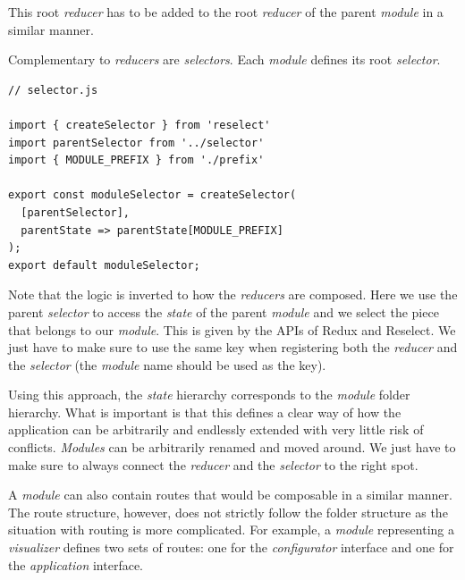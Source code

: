 This root \emph{reducer} has to be added to the root \emph{reducer} of the parent \emph{module} in a similar manner. 

Complementary to \emph{reducers} are \emph{selectors}. Each \emph{module} defines its root \emph{selector}.

\begin{verbatim}
// selector.js

import { createSelector } from 'reselect'
import parentSelector from '../selector'
import { MODULE_PREFIX } from './prefix'

export const moduleSelector = createSelector(
  [parentSelector],
  parentState => parentState[MODULE_PREFIX]
);
export default moduleSelector;
\end{verbatim}

Note that the logic is inverted to how the \emph{reducers} are composed. Here we use the parent \emph{selector} to access the \emph{state} of the parent \emph{module} and we select the piece that belongs to our \emph{module}. This is given by the APIs of Redux and Reselect. We just have to make sure to use the same key when registering both the \emph{reducer} and the \emph{selector} (the \emph{module} name should be used as the key).

Using this approach, the \emph{state} hierarchy corresponds to the \emph{module} folder hierarchy. What is important is that this defines a clear way of how the application can be arbitrarily and endlessly extended with very little risk of conflicts. \emph{Modules} can be arbitrarily renamed and moved around. We just have to make sure to always connect the \emph{reducer} and the \emph{selector} to the right spot.

A \emph{module} can also contain routes that would be composable in a similar manner. The route structure, however, does not strictly follow the folder structure as the situation with routing is more complicated. For example, a \emph{module} representing a \emph{visualizer} defines two sets of routes: one for the \emph{configurator} interface and one for the \emph{application} interface.



